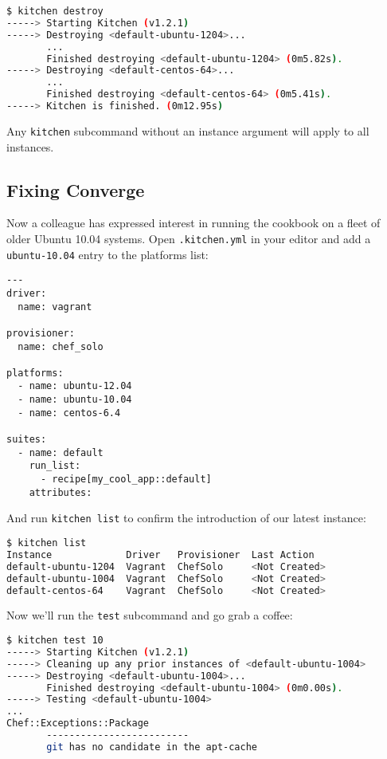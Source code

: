 \begin{lstlisting}[language=Bash,label=lst:testing-test-kitchen25]
$ kitchen destroy
-----> Starting Kitchen (v1.2.1)
-----> Destroying <default-ubuntu-1204>...
       ...
       Finished destroying <default-ubuntu-1204> (0m5.82s).
-----> Destroying <default-centos-64>...
       ...
       Finished destroying <default-centos-64> (0m5.41s).
-----> Kitchen is finished. (0m12.95s)
\end{lstlisting}

Any \lstinline!kitchen! subcommand without an instance argument will apply to all instances.



\subsection{Fixing Converge}

Now a colleague has expressed interest in running the cookbook on a fleet of older Ubuntu 10.04 systems. Open \lstinline!.kitchen.yml! in your editor and add a \lstinline!ubuntu-10.04! entry to the platforms list:

\begin{lstlisting}[label=lst:testing-test-kitchen26]
---
driver:
  name: vagrant

provisioner:
  name: chef_solo

platforms:
  - name: ubuntu-12.04
  - name: ubuntu-10.04
  - name: centos-6.4

suites:
  - name: default
    run_list:
      - recipe[my_cool_app::default]
    attributes:
\end{lstlisting}

And run \lstinline!kitchen list! to confirm the introduction of our latest instance:

\begin{lstlisting}[language=Bash,label=lst:testing-test-kitchen27]
$ kitchen list
Instance             Driver   Provisioner  Last Action
default-ubuntu-1204  Vagrant  ChefSolo     <Not Created>
default-ubuntu-1004  Vagrant  ChefSolo     <Not Created>
default-centos-64    Vagrant  ChefSolo     <Not Created>
\end{lstlisting}

Now we'll run the \lstinline!test! subcommand and go grab a coffee:

\begin{lstlisting}[language=Bash,label=lst:testing-test-kitchen28]
$ kitchen test 10
-----> Starting Kitchen (v1.2.1)
-----> Cleaning up any prior instances of <default-ubuntu-1004>
-----> Destroying <default-ubuntu-1004>...
       Finished destroying <default-ubuntu-1004> (0m0.00s).
-----> Testing <default-ubuntu-1004>
...
Chef::Exceptions::Package
       -------------------------
       git has no candidate in the apt-cache
\end{lstlisting}


